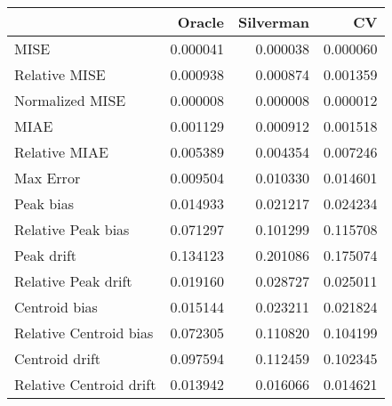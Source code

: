 \begin{tabular}{lrrr}
  \hline
 & Oracle & Silverman & CV \\ 
  \hline
MISE & 0.000041 & 0.000038 & 0.000060 \\ 
  Relative MISE & 0.000938 & 0.000874 & 0.001359 \\ 
  Normalized MISE & 0.000008 & 0.000008 & 0.000012 \\ 
  MIAE & 0.001129 & 0.000912 & 0.001518 \\ 
  Relative MIAE & 0.005389 & 0.004354 & 0.007246 \\ 
  Max Error & 0.009504 & 0.010330 & 0.014601 \\ 
  Peak bias & 0.014933 & 0.021217 & 0.024234 \\ 
  Relative Peak bias & 0.071297 & 0.101299 & 0.115708 \\ 
  Peak drift & 0.134123 & 0.201086 & 0.175074 \\ 
  Relative Peak drift & 0.019160 & 0.028727 & 0.025011 \\ 
  Centroid bias & 0.015144 & 0.023211 & 0.021824 \\ 
  Relative Centroid bias & 0.072305 & 0.110820 & 0.104199 \\ 
  Centroid drift & 0.097594 & 0.112459 & 0.102345 \\ 
  Relative Centroid drift & 0.013942 & 0.016066 & 0.014621 \\ 
   \hline
\end{tabular}
